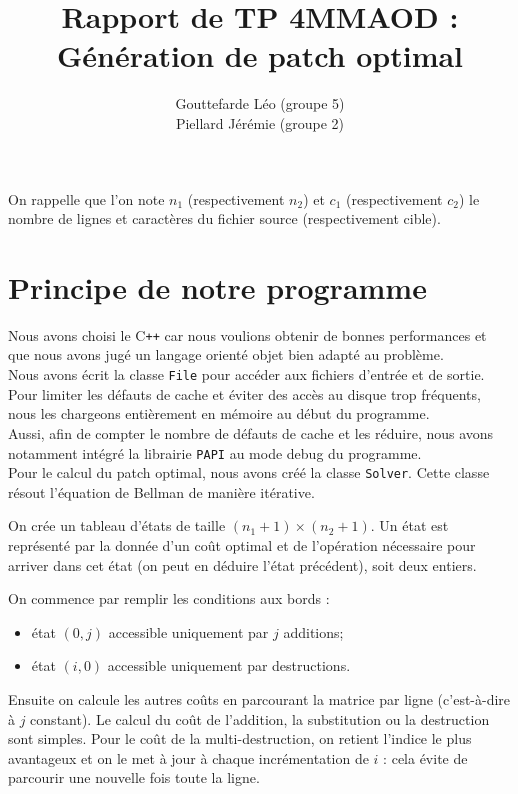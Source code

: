 \documentclass[a4paper, 10pt, french]{article}
\title{Rapport de TP 4MMAOD : Génération de patch optimal}
\author{
{\sc Gouttefarde} Léo (groupe 5)\\
{\sc Piellard} Jérémie (groupe 2)
}
\begin{document}
\maketitle

On rappelle que l'on note $n_1$ (respectivement $n_2$) et $c_1$ (respectivement $c_2$) le nombre de lignes et caractères du fichier source (respectivement cible).

\section{Principe de notre  programme}
Nous avons choisi le C\texttt{++} car nous voulions obtenir de bonnes performances
et que nous avons jugé un langage orienté objet bien adapté au problème.\\

Nous avons écrit la classe \texttt{File} pour accéder aux fichiers d'entrée et de sortie. Pour limiter les défauts de cache et éviter des accès au disque trop fréquents, nous les chargeons entièrement en mémoire au début du programme.\\

Aussi, afin de compter le nombre de défauts de cache et les réduire, nous avons notamment intégré la librairie \texttt{PAPI} au mode debug du programme.\\

Pour le calcul du patch optimal, nous avons créé la classe \texttt{Solver}.
Cette classe résout l'équation de Bellman de manière itérative.

On crée un tableau d'états de taille $(n_1+1)\times(n_2+1)$.
Un état est représenté par la donnée d'un coût optimal et de l'opération nécessaire pour arriver dans cet état
(on peut en déduire l'état précédent), soit deux entiers.

On commence par remplir les conditions aux bords :
\begin{itemize}
\item état $(0,j)$ accessible uniquement par $j$ additions;
\item état $(i,0)$ accessible uniquement par destructions.
\end{itemize}

Ensuite on calcule les autres coûts en parcourant la matrice par ligne
(c'est-à-dire à $j$ constant).
Le calcul du coût de l'addition, la substitution ou la destruction sont simples.
Pour le coût de la multi-destruction, on retient l'indice le plus avantageux
et on le met à jour à chaque incrémentation de $i$ : cela évite de parcourir une nouvelle fois toute la ligne.\\
\end{document}
